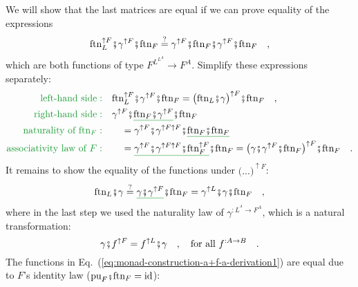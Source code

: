 We will show that the last matrices are equal if we can prove equality
of the expressions
\[
\text{ftn}_{L}^{\uparrow F}\bef\gamma^{\uparrow F}\bef\text{ftn}_{F}\overset{?}{=}\gamma^{\uparrow F}\bef\text{ftn}_{F}\bef\gamma^{\uparrow F}\bef\text{ftn}_{F}\quad,
\]
which are both functions of type $F^{L^{L^{A}}}\rightarrow F^{A}$.
Simplify these expressions separately:
\begin{align*}
{\color{greenunder}\text{left-hand side}:}\quad & \text{ftn}_{L}^{\uparrow F}\bef\gamma^{\uparrow F}\bef\text{ftn}_{F}=\big(\text{ftn}_{L}\bef\gamma\big)^{\uparrow F}\bef\text{ftn}_{F}\quad,\\
{\color{greenunder}\text{right-hand side}:}\quad & \gamma^{\uparrow F}\bef\gunderline{\text{ftn}_{F}\bef\gamma^{\uparrow F}}\bef\text{ftn}_{F}\\
{\color{greenunder}\text{naturality of }\text{ftn}_{F}:}\quad & \quad=\gamma^{\uparrow F}\bef\gamma^{\uparrow F\uparrow F}\bef\gunderline{\text{ftn}_{F}\bef\text{ftn}_{F}}\\
{\color{greenunder}\text{associativity law of }F:}\quad & \quad=\gunderline{\gamma^{\uparrow F}\bef\gamma^{\uparrow F\uparrow F}\bef\text{ftn}_{F}^{\uparrow F}}\bef\text{ftn}_{F}=\big(\gamma\bef\gamma^{\uparrow F}\bef\text{ftn}_{F}\big)^{\uparrow F}\bef\text{ftn}_{F}\quad.
\end{align*}
It remains to show the equality of the functions under $\big(...\big)^{\uparrow F}$:
\begin{equation}
\text{ftn}_{L}\bef\gamma\overset{?}{=}\gunderline{\gamma\bef\gamma^{\uparrow F}}\bef\text{ftn}_{F}=\gamma^{\uparrow L}\bef\gamma\bef\text{ftn}_{F}\quad,\label{eq:monad-construction-a+f-a-derivation1}
\end{equation}
where in the last step we used the naturality law of $\gamma^{:L^{^{A}}\rightarrow F^{A}}$,
which is a natural transformation:
\[
\gamma\bef f^{\uparrow F}=f^{\uparrow L}\bef\gamma\quad,\quad\text{for all }f^{:A\rightarrow B}\quad.
\]
The functions in Eq.~(\ref{eq:monad-construction-a+f-a-derivation1})
are equal due to $F$\textsf{'}s identity law ($\text{pu}_{F}\bef\text{ftn}_{F}=\text{id}$):
